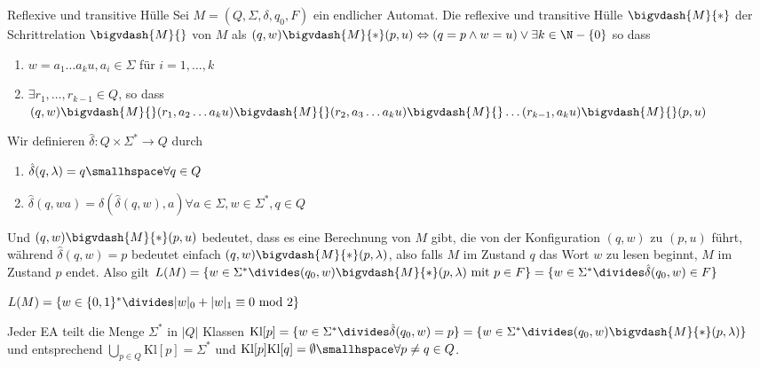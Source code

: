 \begin{definition}[]{Reflexive und transitive Hülle}
    Sei $M = (Q, \Sigma, \delta, q_0, F)$ ein endlicher Automat. Die reflexive und transitive Hülle $\bigvdash{M}{*}$ der Schrittrelation $\bigvdash{M}{}$ von $M$ als
    $(q, w) \bigvdash{M}{*} (p, u) \Leftrightarrow (q = p \land w = u) \lor \exists k \in \N - \{ 0 \}$ so dass
    \begin{enumerate}[label=\textit{(\roman*)}]
        \item $w = a_1\ldots a_ku, a_i \in \Sigma$ für $i = 1, \ldots, k$
        \item $\exists r_1, \ldots, r_{k - 1} \in Q$, so dass
              $(q, w) \bigvdash{M}{} (r_1, a_2 \ldots a_k u) \bigvdash{M}{} (r_2, a_3 \ldots a_k u) \bigvdash{M}{} \ldots (r_{k - 1}, a_k u) \bigvdash{M}{} (p, u)$
    \end{enumerate}
    Wir definieren $\hat{\delta}: Q \times \Sigma^* \rightarrow Q$ durch
    \rmvspace
    \rmvspace
    \begin{multicols}{2}
        \begin{enumerate}[label=\textit{(\roman*)}]
            \item $\hat{\delta}(q, \lambda) = q \smallhspace \forall q \in Q$
            \item $\hat{\delta}(q, wa) = \delta(\hat{\delta}(q, w), a) \forall a \in \Sigma, w \in \Sigma^*, q \in Q$
        \end{enumerate}
    \end{multicols}
\end{definition}
Und $(q, w) \bigvdash{M}{*} (p, u)$ bedeutet, dass es eine Berechnung von $M$ gibt, die von der Konfiguration $(q, w)$ zu $(p, u)$ führt,
während $\hat{\delta}(q, w) = p$ bedeutet einfach $(q, w) \bigvdash{M}{*} (p, \lambda)$, also falls $M$ im Zustand $q$ das Wort $w$ zu lesen beginnt, $M$ im Zustand $p$ endet.
Also gilt $L(M) = \{ w \in \Sigma^* \divides (q_0, w) \bigvdash{M}{*} (p, \lambda) \text{ mit } p \in F \} = \{ w \in \Sigma^* \divides \hat{\delta}(q_0, w) \in F \}$

\inlinelemma $L(M) = \{ w \in \{ 0, 1 \}^* \divides |w|_0 + |w|_1 \equiv 0 \text{ mod } 2 \}$

Jeder EA teilt die Menge $\Sigma^*$ in $|Q|$ Klassen
$\text{Kl}[p] = \{ w \in \Sigma^* \divides \hat{\delta}(q_0, w) = p \} = \{ w \in \Sigma^* \divides (q_0, w) \bigvdash{M}{*} (p, \lambda) \}$
und entsprechend $\bigcup_{p \in Q} \text{Kl}[p] = \Sigma^*$ und $\text{Kl}[p] \text{Kl}[q] = \emptyset \smallhspace \forall p \neq q \in Q$.

